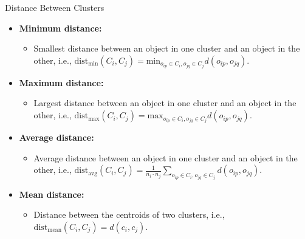 \begin{frame}{Distance Between Clusters}
  \begin{itemize}
  \item \textbf{Minimum distance:}
    \begin{itemize}
    \item Smallest distance between an object in one cluster and an
      object in the other, i.e., $\text{dist}_{\text{min}} (C_i, C_j) =
      \text{min}_{o_{ip} \in C_i, o_{jq} \in C_j} d(o_{ip}, o_{jq})$.
    \end{itemize}
  \item \textbf{Maximum distance:}
    \begin{itemize}
    \item Largest distance between an object in one cluster and an
      object in the other, i.e., $\text{dist}_\text{max}(C_i, C_j) =
      \text{max}_{o_{ip} \in C_i, o_{jq} \in C_j} d(o_{ip}, o_{jq}).$
    \end{itemize}
  \item \textbf{Average distance:}
    \begin{itemize}
    \item Average distance between an object in one cluster and an
      object in the other, i.e., $\text{dist}_{\text{avg}} (C_i, C_j) =
      \frac{1}{n_i \cdot n_j} \sum_{o_{ip} \in C_i, o_{jq} \in C_j}
      d(o_{ip}, o_{jq}).$
    \end{itemize}
  \item \textbf{Mean distance:}
    \begin{itemize}
    \item Distance between the centroids of two clusters, i.e.,
      $\text{dist}_{\text{mean}} (C_i, C_j) = d(c_i, c_j).$
    \end{itemize}
  \end{itemize}
\end{frame}

